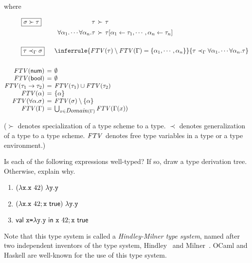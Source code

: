 \begin{exercise}
where

\vspace{-1em}

\[
\begin{array}{@{}r@{\hskip4pt}c@{\hskip4pt}l@{}}
  \begin{array}{c}
    \fbox{$\sigma\succ\tau$} \\[0.5em]
    \ \\[1em]
  \end{array}
  &&
  \begin{array}{r@{\hskip4pt}c@{\hskip4pt}l}
    \tau&\succ&\tau \\[0.5em]
    \tforall{\alpha_1}{\cdots\tforall{\alpha_n}{\tau}}&\succ&
    \tau[\alpha_1\leftarrow\tau_1,\cdots,\alpha_n\leftarrow\tau_n]\\[1em]
  \end{array}
  \\[2em]
  \fbox{$\tau\prec_\Gamma\sigma$}
  &&
  \inferrule
  { \embox{FTV}(\tau)\setminus\embox{FTV}(\Gamma)=\{\alpha_1,\cdots,\alpha_n\} }
  { \tau\prec_\Gamma\tforall{\alpha_1}{\cdots\tforall{\alpha_n}{\tau}} }
  \\[2em]
\embox{FTV}(\tnum) &=& \emptyset
\\
\embox{FTV}(\tbool) &=& \emptyset
\\
\embox{FTV}(\tarrow{\tau_1}{\tau_2}) &=& \embox{FTV}(\tau_1) \cup \embox{FTV}(\tau_2)
\\
\embox{FTV}(\alpha) &=& \{\alpha\}
\\
  \embox{FTV}(\tforall{\alpha}{\sigma}) &=& \embox{FTV}(\sigma) \setminus \{\alpha\}
\\
\embox{FTV}(\Gamma) &=& \bigcup_{x\in\dom{\Gamma}}\embox{FTV}(\Gamma(x))
\\
\end{array}
\]

($\succ$ denotes specialization of a type scheme to a type. $\prec$ denotes
generalization of a type to a type scheme. $\mbox{\emph{FTV}}$ denotes free type
variables in a type or a type environment.)

Is each of the following expressions well-typed? If so, draw a type derivation
tree. Otherwise, explain why.

\begin{enumerate}
  \item $(\lambda\texttt{x}.\texttt{x}\ 42)\ \lambda\texttt{y}.\texttt{y}$
  \item $(\lambda\texttt{x}.\texttt{x}\ 42;\texttt{x}\ \textsf{true})\ \lambda\texttt{y}.\texttt{y}$
  \item $\textsf{val}\ \texttt{x}\texttt{=}\lambda\texttt{y}.\texttt{y}\ \textsf{in}\ \texttt{x}\ 42;\texttt{x}\ \textsf{true}$
\end{enumerate}

Note that this type system is called a \textit{Hindley-Milner type
system}, named after two independent inventors
of the type system, Hindley~\cite{hindley1969principal} and
Milner~\cite{milner1978theory}. OCaml and Haskell are well-known for the use of
this type system.

\end{exercise}
